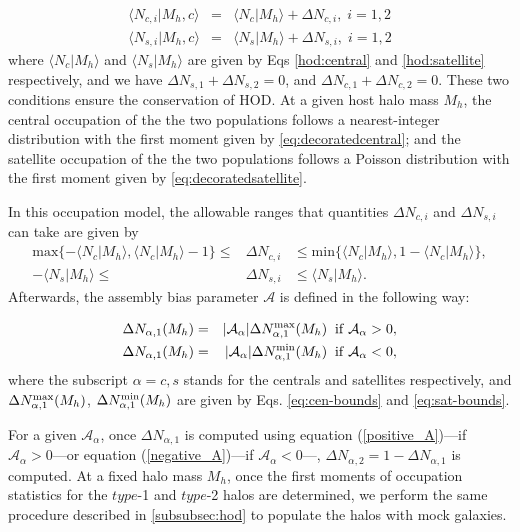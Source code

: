 \documentclass[12pt, preprint]{aastex}
\begin{document}
\begin{eqnarray}
\langle N_{c,i} | M_{h},c\rangle &=& \langle N_{c} | M_{h}\rangle + \Delta N _{c,i}, \; i=1,2 \label{eq:decoratedcentral} \\
\langle N_{s,i} | M_{h},c\rangle &=& \langle N_{s} | M_{h}\rangle + \Delta N _{s,i}, \; i=1,2 \label{eq:decoratedsatellite}
\end{eqnarray}
where $\langle N_{c} | M_{h}\rangle$ and $\langle N_{s} | M_{h}\rangle$ are given by Eqs \ref{hod:central} and \ref{hod:satellite} respectively, and we have $\Delta N_{s,1} + \Delta N_{s,2} = 0$, and $\Delta N_{c,1} + \Delta N_{c,2} = 0$. These two conditions ensure the conservation of HOD. At a given host halo mass $M_{h}$, the central occupation of the the two populations follows a nearest-integer distribution with the first moment given by \ref{eq:decoratedcentral}; and the satellite occupation of the the two populations follows a Poisson distribution with the first moment given by \ref{eq:decoratedsatellite}.

In this occupation model, the allowable ranges that quantities $\Delta N_{c,i}$ and $\Delta N_{s,i}$ can take are given by 
\begin{eqnarray}
\mathrm{max} \{-\langle N_{c} | M_{h}\rangle, \langle N_{c} | M_{h}\rangle -1 \} \leq &\Delta N_{c,i}& \leq \mathrm{min} \{\langle N_{c} | M_{h}\rangle, 1-\langle N_{c} | M_{h}\rangle\}
 , \label{eq:cen-bounds} \\
-\langle N_{s} | M_{h}\rangle \leq & \Delta N_{s,i}& \leq \langle N_{s} | M_{h}\rangle. \label{eq:sat-bounds}
\end{eqnarray}
Afterwards, the assembly bias parameter $\mathcal{A}$ is defined in the following way:

\begin{eqnarray}
\Delta N_{\alpha , 1}(M_{h}) &=& |\mathcal{A_\alpha}| \Delta N_{\alpha , 1}^{\rm max}(M_{h}) \; \; \rm{if} \; \mathcal{A_\alpha} > 0,  \label{positive_A} \\
\Delta N_{\alpha , 1}(M_{h}) &=& |\mathcal{A_\alpha}| \Delta N_{\alpha , 1}^{\rm min}(M_{h}) \; \; \rm{if} \; \mathcal{A_\alpha} < 0, \label{negative_A}
\end{eqnarray}
where the subscript $\alpha = c , s$ stands for the centrals and satellites respectively, and $\Delta N_{\alpha , 1}^{\rm max}(M_{h})$, $\Delta N_{\alpha , 1}^{\rm min}(M_{h})$ are given by Eqs. \ref{eq:cen-bounds} and \ref{eq:sat-bounds}. 

For a given $\mathcal{A}_{\alpha}$, once $\Delta N_{\alpha,1}$ is computed using equation (\ref{positive_A})---if $\mathcal{A}_{\alpha}>0$---or equation (\ref{negative_A})---if $\mathcal{A}_{\alpha}<0$---, $\Delta N_{\alpha,2} = 1 - \Delta N_{\alpha,1}$ is computed. At a fixed halo mass $M_{h}$, once the first moments of occupation statistics for the $type$-1 and $type$-2 halos are determined, we perform the same procedure described in \ref{subsubsec:hod} to populate the halos with mock galaxies.
\end{document}
